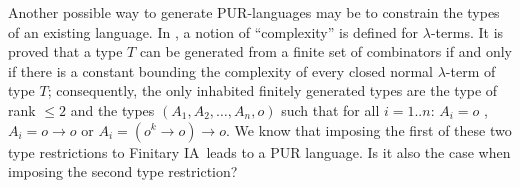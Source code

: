\documentclass{llncs}
\newcommand\ialgol{\textsf{IA}}
\begin{document}
Another possible way to generate PUR-languages may be to constrain
the types of an existing language. In \cite{DBLP:conf/tlca/Joly01},
a notion of ``complexity'' is defined for $\lambda$-terms. It is
proved that a type $T$ can be generated from a finite set of
combinators if and only if there is a constant bounding the
complexity of every closed normal $\lambda$-term of type $T$;
consequently, the only inhabited finitely generated types are the
type of rank $\leq 2$ and the types $(A_1, A_2, \ldots, A_n, o)$
such that for all $i = 1..n$: $A_i = o$ , $A_i = o \rightarrow o$ or
$A_i = (o^k \rightarrow o) \rightarrow o$. We know that imposing the
first of these two type restrictions to Finitary \ialgol\ leads to a
PUR language. Is it also the case when imposing the second type
restriction?




\end{document}
